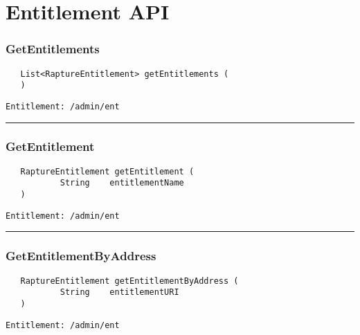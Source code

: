 \chapter{Entitlement API}

\subsection{GetEntitlements}
\label{Api:GetEntitlements}
\begin{Verbatim}
   List<RaptureEntitlement> getEntitlements (
   )
\end{Verbatim}
\begin{Verbatim}[formatcom=\color{Maroon}]
  Entitlement: /admin/ent
\end{Verbatim}



\rule{12cm}{2pt}
\subsection{GetEntitlement}
\label{Api:GetEntitlement}
\begin{Verbatim}
   RaptureEntitlement getEntitlement (
           String    entitlementName
   )
\end{Verbatim}
\begin{Verbatim}[formatcom=\color{Maroon}]
  Entitlement: /admin/ent
\end{Verbatim}



\rule{12cm}{2pt}
\subsection{GetEntitlementByAddress}
\label{Api:GetEntitlementByAddress}
\begin{Verbatim}
   RaptureEntitlement getEntitlementByAddress (
           String    entitlementURI
   )
\end{Verbatim}
\begin{Verbatim}[formatcom=\color{Maroon}]
  Entitlement: /admin/ent
\end{Verbatim}



